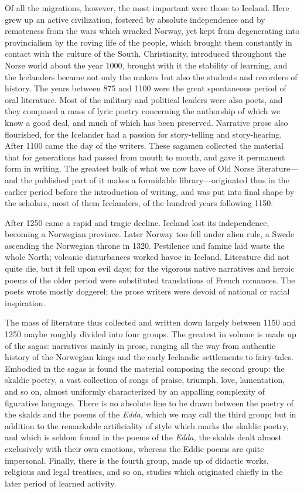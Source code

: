 \documentclass{scrbook}
\newcommand{\commamdash}{---} %
\begin{document}
Of all the migrations, however, the most important were those to Iceland. Here grew up an active civilization, fostered by absolute independence and by remoteness from the wars which wracked Norway, yet kept from degenerating into provincialism by the roving life of the people, which brought them constantly in contact with the culture of the South. Christianity, introduced throughout the Norse world about the year 1000, brought with it the stability of learning, and the Icelanders became not only the makers but also the students and recorders of history. The years between 875 and 1100 were the great spontaneous period of oral literature. Most of the military and political leaders were also poets, and they composed a mass of lyric poetry concerning the authorship of which we know a good deal, and much of which has been preserved. Narrative prose also flourished, for the Icelander had a passion for story-telling and story-hearing. After 1100 came the day of the writers. These sagamen collected the material that for generations had passed from mouth to mouth, and gave it permanent form in writing. The greatest bulk of what we now have of Old Norse literature{\commamdash}and the published part of it makes a formidable library{\commamdash}originated thus in the earlier period before the introduction of writing, and was put into final shape by the scholars, most of them Icelanders, of the hundred years following 1150.

After 1250 came a rapid and tragic decline. Iceland lost its independence, becoming a Norwegian province. Later Norway too fell under alien rule, a Swede ascending the Norwegian throne in 1320. Pestilence and famine laid waste the whole North; volcanic disturbances worked havoc in Iceland. Literature did not quite die, but it fell upon evil days; for the vigorous native narratives and heroic poems of the older period were substituted translations of French romances. The poets wrote mostly doggerel; the prose writers were devoid of national or racial inspiration.

The mass of literature thus collected and written down largely between 1150 and 1250 maybe roughly divided into four groups. The greatest in volume is made up of the sagas: narratives mainly in prose, ranging all the way from authentic history of the Norwegian kings and the early Icelandic settlements to fairy-tales. Embodied in the sagas is found the material composing the second group: the skaldic poetry, a vast collection of songs of praise, triumph, love, lamentation, and so on, almost uniformly characterized by an appalling complexity of figurative language. There is no absolute line to be drawn between the poetry of the skalds and the poems of the \emph{Edda,} which we may call the third group; but in addition to the remarkable artificiality of style which marks the skaldic poetry, and which is seldom found in the poems of the \emph{Edda,} the skalds dealt almost exclusively with their own emotions, whereas the Eddic poems are quite impersonal. Finally, there is the fourth group, made up of didactic works, religious and legal treatises, and so on, studies which originated chiefly in the later period of learned activity.
\end{document}
